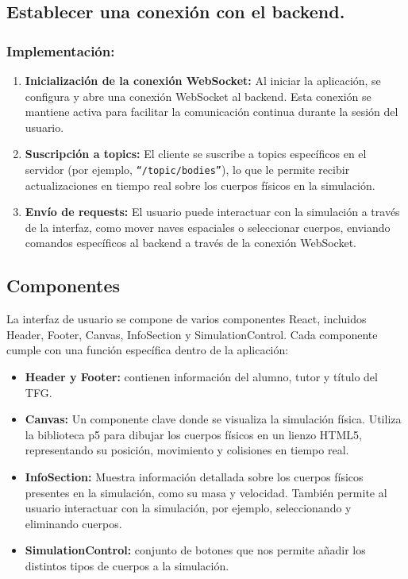 \subsection{Establecer una conexión con el backend.}
\subsubsection{\textbf{Implementación:}}
\begin{enumerate}
    \item \textbf{Inicialización de la conexión WebSocket:} Al iniciar la aplicación, se configura y abre una conexión WebSocket al backend. Esta conexión se mantiene activa para facilitar la comunicación continua durante la sesión del usuario.
    \item \textbf{Suscripción a topics:} El cliente se suscribe a topics específicos en el servidor (por ejemplo, \texttt{``/topic/bodies''}), lo que le permite recibir actualizaciones en tiempo real sobre los cuerpos físicos en la simulación.
    \item \textbf{Envío de requests:} El usuario puede interactuar con la simulación a través de la interfaz, como mover naves espaciales o seleccionar cuerpos, enviando comandos específicos al backend a través de la conexión WebSocket.
\end{enumerate}
\subsection{Componentes}
La interfaz de usuario se compone de varios componentes React, incluidos Header, Footer, Canvas, InfoSection y SimulationControl. Cada componente cumple con una función específica dentro de la aplicación:
\begin{itemize}
    \item \textbf{Header y Footer:} contienen información del alumno, tutor y título del TFG.
    \item \textbf{Canvas:} Un componente clave donde se visualiza la simulación física. Utiliza la biblioteca p5 para dibujar los cuerpos físicos en un lienzo HTML5, representando su posición, movimiento y colisiones en tiempo real.
    \item \textbf{InfoSection:} Muestra información detallada sobre los cuerpos físicos presentes en la simulación, como su masa y velocidad. También permite al usuario interactuar con la simulación, por ejemplo, seleccionando y eliminando cuerpos.
    \item \textbf{SimulationControl:} conjunto de botones que nos permite añadir los distintos tipos de cuerpos a la simulación.
\end{itemize}
